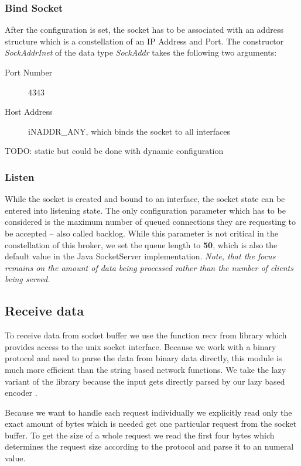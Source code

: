 \subsubsection{Bind Socket}

After the configuration is set, the socket has to be associated with an address
structure which is a constellation of an IP Address and Port. The constructor
\textit{SockAddrInet} of the data type \textit{SockAddr} takes the following
two arguments:

\begin{description}
  \item[Port Number] 4343
  \item[Host Address] iNADDR\_ANY, which binds the socket to all interfaces
\end{description}

TODO: static but could be done with dynamic configuration

\subsubsection{Listen}

While the socket is created and bound to an interface, the socket state can be
entered into listening state. The only configuration parameter which has to be
considered is the maximum number of queued connections they are requesting to
be accepted -- also called backlog. While this parameter is not critical in the
constellation of this broker, we set the queue length to \textbf{50}, which is
also the default value in the Java SocketServer implementation. \textit{Note,
that the focus remains on the amount of data being processed rather than the
number of clients being served.}

\subsection{Receive data}
To receive data from socket buffer we use the function recv from
library which provides access to the unix socket interface. Because we work
with a binary protocol and need to parse the data from binary data directly,
this module is much more efficient than the string based network functions. We
take the lazy variant of the library because the input gets directly parsed by
our lazy based encoder .

Because we want to handle each request individually we explicitly read
only the exact amount of bytes which is needed get one particular request from
the socket buffer. To get the size of a whole request we read the first four
bytes which determines the request size according to the protocol and parse it
to an numeral value.

